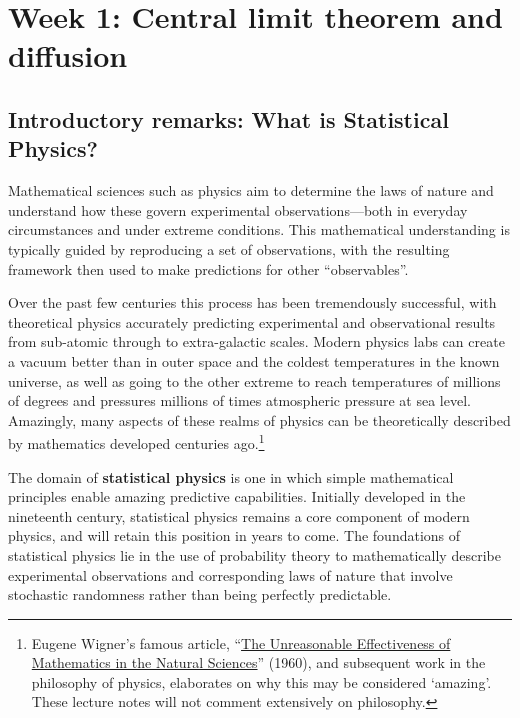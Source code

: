 \renewcommand{\thisweek}{MATH327 Week 1}
\renewcommand{\moddate}{Last modified 31 Jan.~2021}
\setcounter{section}{1}
\setcounter{subsection}{0}
{}
\section*{Week 1: Central limit theorem and diffusion}

\subsection*{Introductory remarks: What is Statistical Physics?}
Mathematical sciences such as physics aim to determine the laws of nature and understand how these govern experimental observations---both in everyday circumstances and under extreme conditions.
This mathematical understanding is typically guided by reproducing a set of observations, with the resulting framework then used to make predictions for other ``observables''.

Over the past few centuries this process has been tremendously successful, with theoretical physics accurately predicting experimental and observational results from sub-atomic through to extra-galactic scales.
Modern physics labs can create a vacuum better than in outer space and the coldest temperatures in the known universe, as well as going to the other extreme to reach temperatures of millions of degrees and pressures millions of times atmospheric pressure at sea level.
Amazingly, many aspects of these realms of physics can be theoretically described by mathematics developed centuries ago.\footnote{Eugene Wigner's famous article, ``\href{https://en.wikipedia.org/wiki/The_Unreasonable_Effectiveness_of_Mathematics_in_the_Natural_Sciences}{The Unreasonable Effectiveness of Mathematics in the Natural Sciences}'' (1960), and subsequent work in the philosophy of physics, elaborates on why this may be considered `amazing'.  These lecture notes will not comment extensively on philosophy.}

The domain of \textbf{statistical physics} is one in which simple mathematical principles enable amazing predictive capabilities.
Initially developed in the nineteenth century, statistical physics remains a core component of modern physics, and will retain this position in years to come.
The foundations of statistical physics lie in the use of probability theory to mathematically describe experimental observations and corresponding laws of nature that involve stochastic randomness rather than being perfectly predictable.

